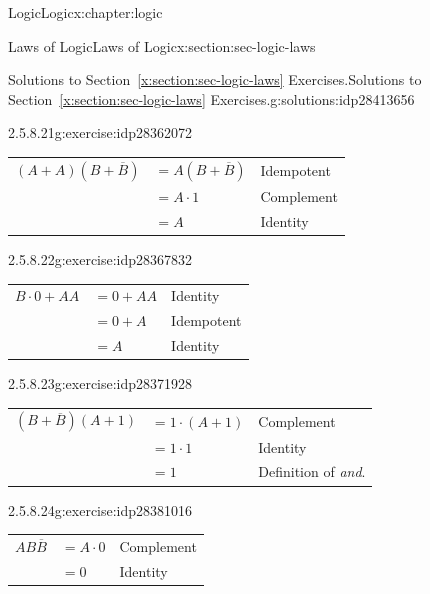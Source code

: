 \documentclass[twoside,10pt,]{book}
\newcommand{\tabularfont}{\relax}
\newcommand{\xreffont}{\relax}
\numberwithin{equation}{section}
\begin{document}
\begin{chapterptx}{Logic}{}{Logic}{}{}{x:chapter:logic}
\begin{sectionptx}{Laws of Logic}{}{Laws of Logic}{}{}{x:section:sec-logic-laws}
\begin{solutions-subsection}{Solutions to Section~{\xreffont\ref*{x:section:sec-logic-laws}} Exercises.}{}{Solutions to Section~{\xreffont\ref*{x:section:sec-logic-laws}} Exercises.}{}{}{g:solutions:idp28413656}
\begin{exercisegroup}
\begin{divisionsolutioneg}{2.5.8.21}{}{g:exercise:idp28362072}%
\par\smallskip%
\noindent\hypertarget{g:solution:idp28359896-main}{}\begin{center}%
{\tabularfont%
\begin{tabular}{lll}
\multicolumn{1}{c}{\((A+A)(B+\overline{B})\)}&\(= A(B+\overline{B})\)&Idempotent\tabularnewline[0pt]
&\(= A\cdot 1\)&Complement\tabularnewline[0pt]
&\(= A\)&Identity
\end{tabular}
}%
\end{center}%
\end{divisionsolutioneg}%
\begin{divisionsolutioneg}{2.5.8.22}{}{g:exercise:idp28367832}%
\par\smallskip%
\noindent\hypertarget{g:solution:idp28369624-main}{}\begin{center}%
{\tabularfont%
\begin{tabular}{lll}
\multicolumn{1}{c}{\(B\cdot 0+AA\)}&\(= 0+AA\)&Identity\tabularnewline[0pt]
&\(= 0+A\)&Idempotent\tabularnewline[0pt]
&\(= A\)&Identity
\end{tabular}
}%
\end{center}%
\end{divisionsolutioneg}%
\begin{divisionsolutioneg}{2.5.8.23}{}{g:exercise:idp28371928}%
\par\smallskip%
\noindent\hypertarget{g:solution:idp28370520-main}{}\begin{center}%
{\tabularfont%
\begin{tabular}{lll}
\multicolumn{1}{c}{\((B+\overline{B})(A+1)\)}&\(= 1\cdot(A+1)\)&Complement\tabularnewline[0pt]
&\(= 1\cdot 1\)&Identity\tabularnewline[0pt]
&\(= 1\)&Definition of \emph{and}.
\end{tabular}
}%
\end{center}%
\end{divisionsolutioneg}%
\begin{divisionsolutioneg}{2.5.8.24}{}{g:exercise:idp28381016}%
\par\smallskip%
\noindent\hypertarget{g:solution:idp28382808-main}{}\begin{center}%
{\tabularfont%
\begin{tabular}{lll}
\multicolumn{1}{c}{\(AB\overline{B}\)}&\(=A\cdot 0\)&Complement\tabularnewline[0pt]
&\(=0\)&Identity
\end{tabular}
}
\end{center}
\end{divisionsolutioneg}
\end{exercisegroup}
\end{solutions-subsection}
\end{sectionptx}
\end{chapterptx}
\end{document}
